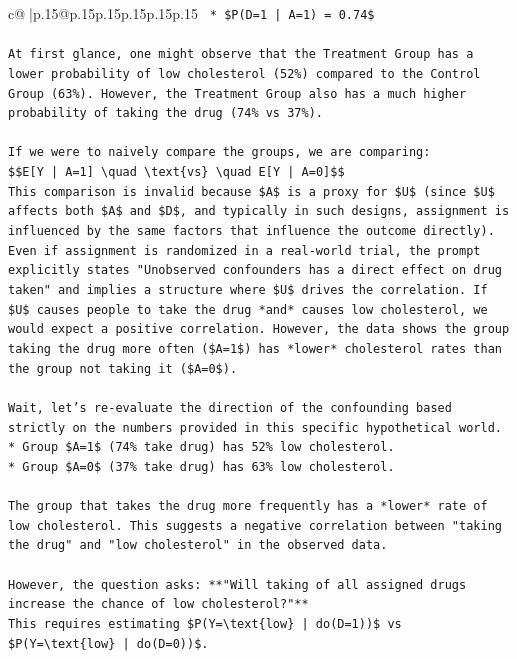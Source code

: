 \documentclass{article}
\begin{document}
{\begin{supertabular}{c@{$\;$}|p{.15\linewidth}@{}p{.15\linewidth}p{.15\linewidth}p{.15\linewidth}p{.15\linewidth}p{.15\linewidth}}
{{{\texttt{    *   \$P(D=1 | A=1) = 0.74\$} \\
\\ 
\texttt{At first glance, one might observe that the Treatment Group has a lower probability of low cholesterol (52\%) compared to the Control Group (63\%). However, the Treatment Group also has a much higher probability of taking the drug (74\% vs 37\%).} \\
\\ 
\texttt{If we were to naively compare the groups, we are comparing:} \\
\texttt{\$\$E{[}Y | A=1{]} \textbackslash{}quad \textbackslash{}text\{vs\} \textbackslash{}quad E{[}Y | A=0{]}\$\$} \\
\texttt{This comparison is invalid because \$A\$ is a proxy for \$U\$ (since \$U\$ affects both \$A\$ and \$D\$, and typically in such designs, assignment is influenced by the same factors that influence the outcome directly). Even if assignment is randomized in a real{-}world trial, the prompt explicitly states "Unobserved confounders has a direct effect on drug taken" and implies a structure where \$U\$ drives the correlation. If \$U\$ causes people to take the drug *and* causes low cholesterol, we would expect a positive correlation. However, the data shows the group taking the drug more often (\$A=1\$) has *lower* cholesterol rates than the group not taking it (\$A=0\$).} \\
\\ 
\texttt{Wait, let's re{-}evaluate the direction of the confounding based strictly on the numbers provided in this specific hypothetical world.} \\
\texttt{*   Group \$A=1\$ (74\% take drug) has 52\% low cholesterol.} \\
\texttt{*   Group \$A=0\$ (37\% take drug) has 63\% low cholesterol.} \\
\\ 
\texttt{The group that takes the drug more frequently has a *lower* rate of low cholesterol. This suggests a negative correlation between "taking the drug" and "low cholesterol" in the observed data.} \\
\\ 
\texttt{However, the question asks: **"Will taking of all assigned drugs increase the chance of low cholesterol?"**} \\
\texttt{This requires estimating \$P(Y=\textbackslash{}text\{low\} | do(D=1))\$ vs \$P(Y=\textbackslash{}text\{low\} | do(D=0))\$.} \\
\\ 
}}}
\end{supertabular}}
\end{document}
